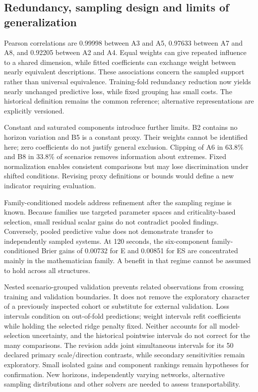 \subsection{Redundancy, sampling design and limits of generalization}
Pearson correlations are 0.99998 between A3 and A5, 0.97633 between A7 and
A8, and 0.92205 between A2 and A4. Equal weights can give repeated influence
to a shared dimension, while fitted coefficients can exchange weight between
nearly equivalent descriptions. These associations concern the sampled
support rather than universal equivalence. Training-fold redundancy reduction now yields nearly unchanged predictive
loss, while fixed grouping has small costs. The historical definition remains
the common reference; alternative representations are explicitly versioned.

Constant and saturated components introduce further limits. B2 contains
no horizon variation and B5 is a constant proxy. Their weights cannot be
identified here; zero coefficients do not justify general exclusion.
Clipping of A6 in 63.8\% and B8 in 33.8\% of scenarios removes information
about extremes. Fixed normalization enables consistent comparisons but may
lose discrimination under shifted conditions. Revising proxy definitions
or bounds would define a new indicator requiring evaluation.

Family-conditioned models address refinement after the sampling regime is
known. Because families use targeted parameter spaces and criticality-based
selection, small residual scalar gains do not contradict pooled findings.
Conversely, pooled predictive value does not demonstrate transfer to
independently sampled systems. At 120 seconds, the six-component
family-conditioned Brier gains of 0.00732 for E and 0.00851 for ES are
concentrated mainly in the mathematician family. A benefit in that regime
cannot be assumed to hold across all structures.

Nested scenario-grouped validation prevents related observations from
crossing training and validation boundaries. It does not remove the
exploratory character of a previously inspected cohort or substitute for
external validation. Loss intervals condition on out-of-fold predictions;
weight intervals refit coefficients while holding the selected ridge
penalty fixed. Neither accounts for all model-selection uncertainty, and
the historical pointwise intervals do not correct for the many comparisons.
The revision adds joint simultaneous intervals for its 50 declared primary
scale/direction contrasts, while secondary sensitivities remain exploratory. Small isolated
gains and component rankings remain hypotheses for confirmation. New
horizons, independently varying networks, alternative sampling distributions
and other solvers are needed to assess transportability.

